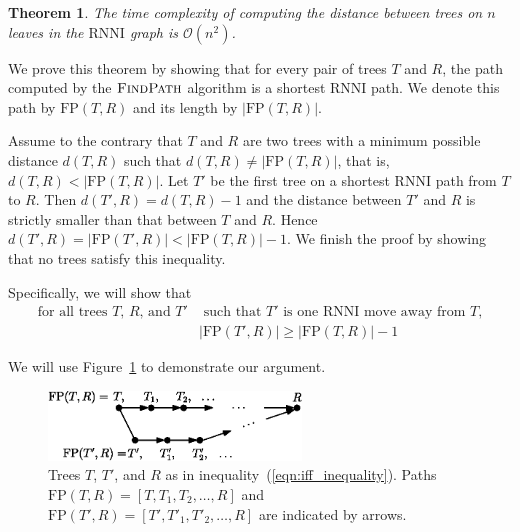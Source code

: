 \documentclass[11pt]{amsart}
\newtheorem{theorem}{Theorem}
\newcommand{\rnni}{\mathrm{RNNI}}
\newcommand{\findpath}{\textsc{FindPath}}
\newcommand{\fp}{\mathrm{FP}}
\renewcommand{\O}{\mathcal O}
\begin{document}
\begin{theorem}
The time complexity of computing the distance between trees on $n$ leaves in the $\rnni$ graph is $\O(n^2)$.
\label{thm:rnni_polynomial}
\end{theorem}

\proof
We prove this theorem by showing that for every pair of trees $T$ and $R$, the path computed by the $\findpath$ algorithm is a shortest $\rnni$ path.
We denote this path by $\fp(T, R)$ and its length by $|\fp(T, R)|$.

Assume to the contrary that $T$ and $R$ are two trees with a minimum possible distance $d(T, R)$ such that $d(T,R) \neq |\fp(T,R)|$, that is, $d(T,R) < |\fp(T,R)|$.
Let $T'$ be the first tree on a shortest $\rnni$ path from $T$ to $R$.
Then $d(T',R) = d(T, R) - 1$ and the distance between $T'$ and $R$ is strictly smaller than that between $T$ and $R$.
Hence $d(T', R) = |\fp(T',R)| < |\fp(T,R)| - 1$.
We finish the proof by showing that no trees satisfy this inequality.

Specifically, we will show that
\begin{equation}
\begin{split}
\mbox{for all trees $T$, $R$, and $T'$}	& \mbox{ such that $T'$ is one $\rnni$ move away from $T$,}\\
					&|\fp(T',R)| \geq |\fp(T,R)| - 1
\end{split}
 \label{eqn:iff_inequality}
\end{equation}

We will use Figure~\ref{fig:proof_idea} to demonstrate our argument.

\begin{figure}[ht]
\centering
\includegraphics[width=0.6\textwidth]{proof_idea_ag}
\caption{Trees $T$, $T'$, and $R$ as in inequality~(\ref{eqn:iff_inequality}).
Paths $\fp(T,R) = [T,T_1,T_2, \ldots, R]$ and $\fp(T',R) = [T',T'_1,T'_2, \ldots, R]$ are indicated by arrows.}
\label{fig:proof_idea}
\end{figure}
\end{document}
